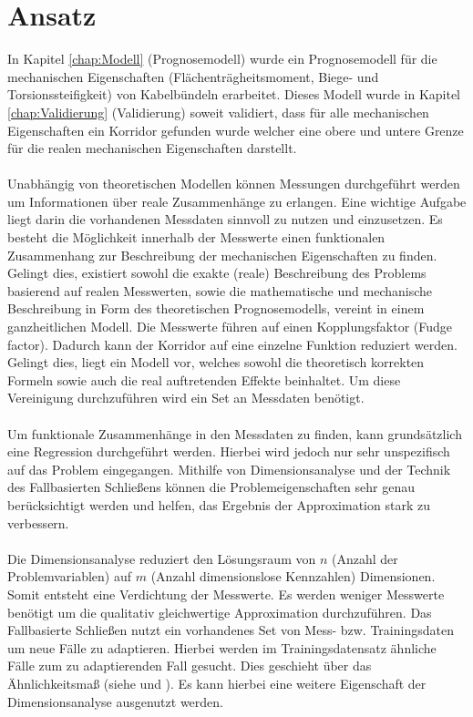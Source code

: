 \section{Ansatz}
\label{sec:Ansatz}
In Kapitel \ref{chap:Modell} (Prognosemodell) wurde ein Prognosemodell für die mechanischen Eigenschaften (Flächenträgheitsmoment, Biege- und Torsionssteifigkeit) von Kabelbündeln erarbeitet. Dieses Modell wurde in Kapitel \ref{chap:Validierung} (Validierung) soweit validiert, dass für alle mechanischen Eigenschaften ein Korridor gefunden wurde welcher eine obere und untere Grenze für die realen mechanischen Eigenschaften darstellt. \\
\parskip 12pt \\
Unabhängig von theoretischen Modellen können Messungen durchgeführt werden um Informationen über reale Zusammenhänge zu erlangen. Eine wichtige Aufgabe liegt darin die vorhandenen Messdaten sinnvoll zu nutzen und einzusetzen. Es besteht die Möglichkeit innerhalb der Messwerte einen funktionalen Zusammenhang zur Beschreibung der mechanischen Eigenschaften zu finden. Gelingt dies, existiert sowohl die exakte (reale) Beschreibung des Problems basierend auf realen Messwerten, sowie die mathematische und mechanische Beschreibung in Form des theoretischen Prognosemodells, vereint in einem ganzheitlichen Modell. Die Messwerte führen auf einen Kopplungsfaktor (Fudge factor). Dadurch kann der Korridor auf eine einzelne Funktion reduziert werden. Gelingt dies, liegt ein Modell vor, welches sowohl die theoretisch korrekten Formeln sowie auch die real auftretenden Effekte beinhaltet. Um diese Vereinigung durchzuführen wird ein Set an Messdaten benötigt.\\
\parskip 12pt \\
Um funktionale Zusammenhänge in den Messdaten zu finden, kann grundsätzlich eine Regression durchgeführt werden. Hierbei wird jedoch nur sehr unspezifisch auf das Problem eingegangen. Mithilfe von Dimensionsanalyse und der Technik des Fallbasierten Schließens können die Problemeigenschaften sehr genau berücksichtigt werden und helfen, das Ergebnis der Approximation stark zu verbessern.\\
\parskip 12pt \\
Die Dimensionsanalyse reduziert den Lösungsraum von $n$ (Anzahl der Problemvariablen) auf $m$ (Anzahl dimensionslose Kennzahlen) Dimensionen. Somit entsteht eine Verdichtung der Messwerte. Es werden weniger Messwerte benötigt um die qualitativ gleichwertige Approximation durchzuführen. Das Fallbasierte Schließen nutzt ein vorhandenes Set von Mess- bzw. Trainingsdaten um neue Fälle zu adaptieren. Hierbei werden im Trainingsdatensatz ähnliche Fälle zum zu adaptierenden Fall gesucht. Dies geschieht über das Ähnlichkeitsmaß (siehe \cite{LSB06} und \cite{Her04}). Es kann hierbei eine weitere Eigenschaft der Dimensionsanalyse ausgenutzt werden.\\

